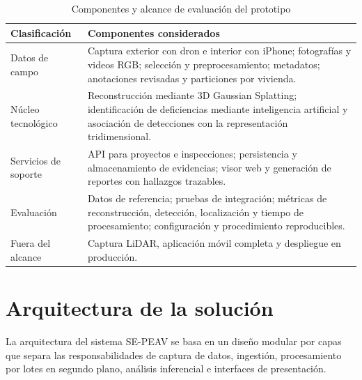\documentclass[12pt,oneside]{report}
\begin{document}
\begin{table}[htbp]
  \centering
  \caption{Componentes y alcance de evaluación del prototipo}
  \label{tab:clasificacion-mvp}
  \small
  \setlength{\tabcolsep}{4pt}
  \renewcommand{\arraystretch}{1.2}
  \begin{tabular}{>{\raggedright\arraybackslash}p{} >{\raggedright\arraybackslash}p{}}
    \toprule
    \textbf{Clasificación} & \textbf{Componentes considerados} \\
    \midrule
    Datos de campo & Captura exterior con dron e interior con iPhone; fotografías y videos RGB; selección y preprocesamiento; metadatos; anotaciones revisadas y particiones por vivienda. \\
    Núcleo tecnológico & Reconstrucción mediante 3D Gaussian Splatting; identificación de deficiencias mediante inteligencia artificial y asociación de detecciones con la representación tridimensional. \\
    Servicios de soporte & API para proyectos e inspecciones; persistencia y almacenamiento de evidencias; visor web y generación de reportes con hallazgos trazables. \\
    Evaluación & Datos de referencia; pruebas de integración; métricas de reconstrucción, detección, localización y tiempo de procesamiento; configuración y procedimiento reproducibles. \\
    Fuera del alcance & Captura LiDAR, aplicación móvil completa y despliegue en producción. \\
    \bottomrule
  \end{tabular}
\end{table}

\section{Arquitectura de la solución}

La arquitectura del sistema SE-PEAV se basa en un diseño modular por capas que separa las responsabilidades de captura de datos, ingestión, procesamiento por lotes en segundo plano, análisis inferencial e interfaces de presentación.
\end{document}
